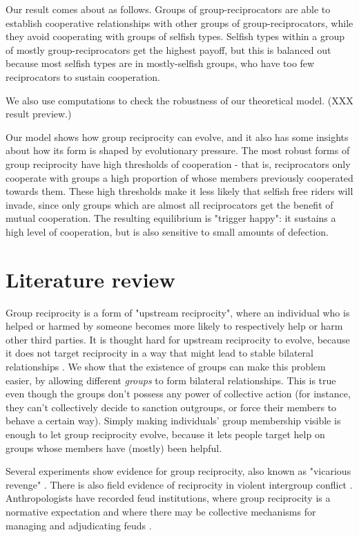 \documentclass[12pt,a4paper]{article}
\begin{document}
Our result comes about as follows. Groups of group-reciprocators are able to
establish cooperative relationships with other groups of group-reciprocators,
while they avoid cooperating with groups of selfish types. Selfish types within
a group of mostly group-reciprocators get the highest payoff, but this is balanced
out because most selfish types are in mostly-selfish groups, who have too
few reciprocators to sustain cooperation.

We also use computations to check the robustness of our theoretical model. (XXX
result preview.)

Our model shows how group reciprocity can evolve, and it also has some insights
about how its form is shaped by evolutionary pressure. The most robust forms of
group reciprocity have high thresholds of cooperation - that is, reciprocators
only cooperate with groups a high proportion of whose members previously
cooperated towards them. These high thresholds make it less likely that selfish
free riders will invade, since only groups which are almost all reciprocators
get the benefit of mutual cooperation. The resulting equilibrium is 
"trigger happy": it sustains a high level of cooperation, but is also sensitive 
to small amounts of defection.

\section{Literature review}


Group reciprocity is a form of "upstream reciprocity", where an individual
who is helped or harmed by someone becomes more likely to respectively help 
or harm other third parties. It is thought hard for upstream reciprocity to evolve,
because it does not target reciprocity in a way that might lead to stable 
bilateral relationships \citep{nowak2007upstream}. We show that the existence
of groups can make this problem easier, by allowing different \emph{groups} 
to form bilateral relationships. This is true even though the groups don't
possess any power of collective action (for instance, they can't collectively
decide to sanction outgroups, or force their members to behave a certain way).
Simply making individuals' group membership visible is enough to let group
reciprocity evolve, because it lets people target help on groups whose members 
have (mostly) been helpful.

Several experiments show evidence for group reciprocity, also known as "vicarious
revenge" \citep{lickel_vicarious_2006,gaertner2008whenrejection,stenstrom_roles_2008,hugh2017intergroup,hugh2019humans,romano2022direct}. There is also field 
evidence of reciprocity in violent intergroup conflict \citep{haushofer_both_2010}.
Anthropologists have recorded feud institutions, where group reciprocity is a
normative expectation and where there may be collective mechanisms for managing 
and adjudicating feuds \citep{boehm1984blood,chagnon1988lifehistories}. 
\end{document}
